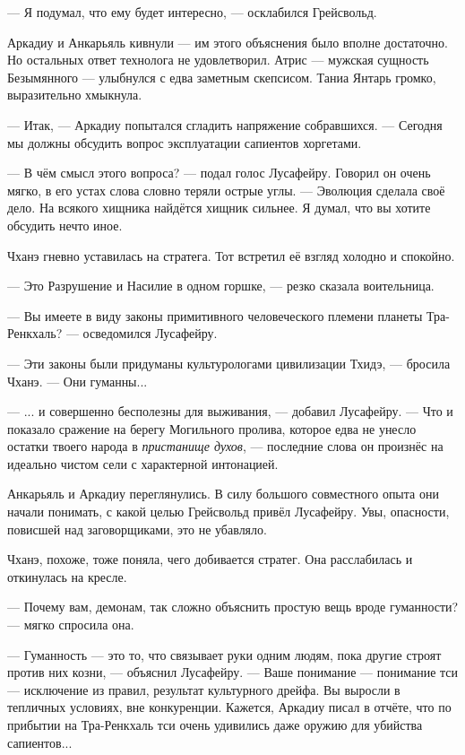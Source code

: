 --- Я подумал, что ему будет интересно, --- осклабился Грейсвольд.

Аркадиу и Анкарьяль кивнули --- им этого объяснения было вполне достаточно.
Но остальных ответ технолога не удовлетворил.
Атрис --- мужская сущность Безымянного --- улыбнулся с едва заметным скепсисом.
Таниа Янтарь громко, выразительно хмыкнула.

--- Итак, --- Аркадиу попытался сгладить напряжение собравшихся.
--- Сегодня мы должны обсудить вопрос эксплуатации сапиентов хоргетами.

--- В чём смысл этого вопроса? --- подал голос Лусафейру.
Говорил он очень мягко, в его устах слова словно теряли острые углы.
--- Эволюция сделала своё дело.
На всякого хищника найдётся хищник сильнее.
Я думал, что вы хотите обсудить нечто иное.

Чханэ гневно уставилась на стратега.
Тот встретил её взгляд холодно и спокойно.

--- Это Разрушение и Насилие в одном горшке, --- резко сказала воительница.

--- Вы имеете в виду законы примитивного человеческого племени планеты Тра-Ренкхаль? --- осведомился Лусафейру.

--- Эти законы были придуманы культурологами цивилизации Тхидэ, --- бросила Чханэ.
--- Они гуманны...

--- ... и совершенно бесполезны для выживания, --- добавил Лусафейру.
--- Что и показало сражение на берегу Могильного пролива, которое едва не унесло остатки твоего народа в \emph{пристанище духов}, --- последние слова он произнёс на идеально чистом сели с характерной интонацией.

Анкарьяль и Аркадиу переглянулись.
В силу большого совместного опыта они начали понимать, с какой целью Грейсвольд привёл Лусафейру.
Увы, опасности, повисшей над заговорщиками, это не убавляло.

Чханэ, похоже, тоже поняла, чего добивается стратег.
Она расслабилась и откинулась на кресле.

--- Почему вам, демонам, так сложно объяснить простую вещь вроде гуманности? --- мягко спросила она.

--- Гуманность --- это то, что связывает руки одним людям, пока другие строят против них козни, --- объяснил Лусафейру.
--- Ваше понимание --- понимание тси --- исключение из правил, результат культурного дрейфа.
Вы выросли в тепличных условиях, вне конкуренции.
Кажется, Аркадиу писал в отчёте, что по прибытии на Тра-Ренкхаль тси очень удивились даже оружию для убийства сапиентов...

